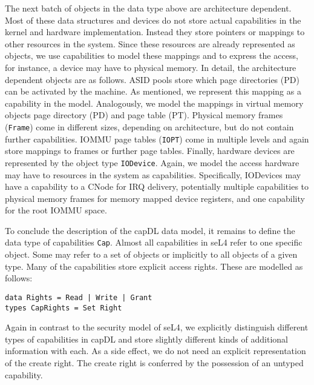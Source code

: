\documentclass[a4paper,12pt]{article}
\begin{document}
The next batch of objects in the data type above are architecture dependent. Most of these data structures and devices do not store actual capabilities in the kernel and hardware implementation. Instead they store pointers or mappings to other resources in the system. Since these resources are already represented as objects, we use capabilities to model these mappings and to express the access, for instance, a device may have to physical memory. In detail, the architecture dependent objects are as follows. ASID pools store which page directories (PD) can be activated by the machine. As mentioned, we represent this mapping as a capability in the model. Analogously, we model the mappings in virtual memory objects page directory (PD) and page table (PT). Physical memory frames (\texttt{Frame}) come in different sizes, depending on architecture, but do not contain further capabilities. IOMMU page tables (\texttt{IOPT}) come in multiple levels and again store mappings to frames or further page tables. Finally, hardware devices are represented by the object type \texttt{IODevice}. Again, we model the access hardware may have to resources in the system as capabilities. Specifically, IODevices may have a capability to a CNode for IRQ delivery, potentially multiple capabilities to physical memory frames for memory mapped device registers, and one capability for the root IOMMU space. 

To conclude the description of the capDL data model, it remains to define the data type of capabilities \texttt{Cap}. Almost all capabilities in seL4 refer to one specific object. Some may refer to a set of objects or implicitly to all objects of a given type. Many of the capabilities store explicit access rights. These are modelled as follows:

\begin{verbatim}
data Rights = Read | Write | Grant
types CapRights = Set Right
\end{verbatim}

Again in contrast to the security model of seL4, we explicitly distinguish different types of capabilities in capDL and store slightly different kinds of additional information with each. As a side effect, we do not need an explicit representation of the create right. The create right is conferred by the possession of an untyped capability.
\end{document}
